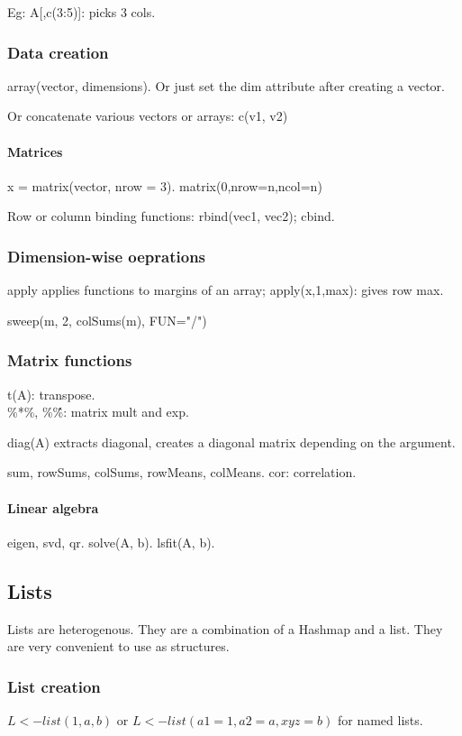 \documentclass[oneside, article]{memoir}
\begin{document}
Eg: A[,c(3:5)]: picks 3 cols.

\subsubsection{Data creation}
array(vector, dimensions). Or just set the dim attribute after creating a vector.

Or concatenate various vectors or arrays: c(v1, v2)

\paragraph{Matrices}
x = matrix(vector, nrow = 3).
matrix(0,nrow=n,ncol=n)

Row or column binding functions: rbind(vec1, vec2); cbind.

\subsubsection{Dimension-wise oeprations}
apply applies functions to margins of an array; apply(x,1,max): gives row max.

sweep(m, 2, colSums(m), FUN="/")

\subsubsection{Matrix functions}
t(A): transpose.\\
\%*\%, \%\^\%: matrix mult and exp.

diag(A) extracts diagonal, creates a diagonal matrix depending on the argument.

sum, rowSums, colSums, rowMeans, colMeans. cor: correlation.

\paragraph{Linear algebra}
eigen, svd, qr. solve(A, b). lsfit(A, b).

\subsection{Lists}
Lists are heterogenous. They are a combination of a Hashmap and a list. They are very convenient to use as structures.

\subsubsection{List creation}
$L <-list(1, a, b)$ or $L <-list(a1= 1, a2 = a, xyz = b)$ for named lists.
\end{document}
